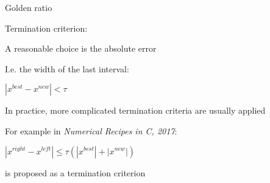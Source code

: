 \documentclass[11pt,compress,t,notes=noshow, xcolor=table]{beamer}
\begin{document}
\begin{framei}{Golden ratio}
  \item Termination criterion:
  \item A reasonable choice is the absolute error
  \item I.e. the width of the last interval:
  \item $|x^{best}-x^{new}| < \tau$
  \item In practice, more complicated termination criteria are usually applied
  \item For example in \emph{Numerical Recipes in C, 2017}:
  \item $|x^{right}-x^{left}| \le \tau (|x^{best}| + |x^{new}|)$
  \item is proposed as a termination criterion
\end{framei}

\endlecture
\end{document}
